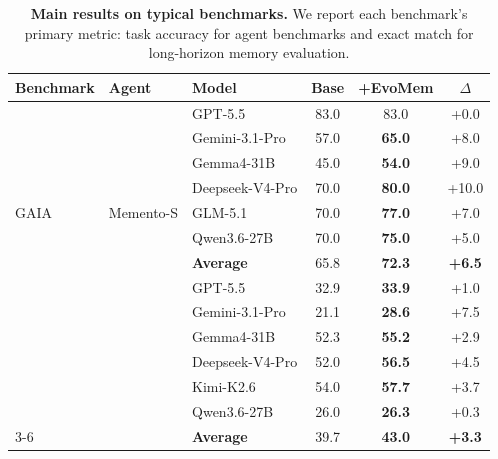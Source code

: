 \documentclass{article}
\begin{document}
\begin{table}[t]
\centering
\setlength{\tabcolsep}{3.5pt}
\renewcommand{\arraystretch}{0.95}
\caption{\small
\textbf{Main results on typical benchmarks.}
We report each benchmark's primary metric: task accuracy for agent benchmarks and exact match for long-horizon memory evaluation.
}
\begin{tabular}{lllccc}
\toprule
\textbf{Benchmark} & \textbf{Agent} & \textbf{Model} & \textbf{Base} & \textbf{+EvoMem} & \textbf{$\Delta$} \\
\midrule

\multirow{9}{*}{GAIA}
& \multirow{9}{*}{Memento-S}
& GPT-5.5 & 83.0 & 83.0 & +0.0 \\
& & Gemini-3.1-Pro & 57.0 & \textbf{65.0} & \textcolor{green!50!black}{+8.0} \\
& & Gemma4-31B & 45.0 & \textbf{54.0} & \textcolor{green!50!black}{+9.0} \\
& & Deepseek-V4-Pro & 70.0 & \textbf{80.0} & \textcolor{green!50!black}{+10.0} \\
& & GLM-5.1 & 70.0 & \textbf{77.0} & \textcolor{green!50!black}{+7.0} \\
& & Qwen3.6-27B & 70.0 & \textbf{75.0} & \textcolor{green!50!black}{+5.0} \\
\cmidrule(l){3-6}
& & \textbf{Average} & 65.8 & \textbf{72.3} & \textcolor{green!50!black}{\textbf{+6.5}} \\
\cmidrule(l){1-6}

\multirow{9}{*}{LoCoMo}
& \multirow{9}{*}{A-Mem}
& GPT-5.5 & 32.9 & \textbf{33.9} & \textcolor{green!50!black}{+1.0} \\
& & Gemini-3.1-Pro & 21.1 & \textbf{28.6} & \textcolor{green!50!black}{+7.5} \\

& & Gemma4-31B & 52.3 & \textbf{55.2} & \textcolor{green!50!black}{+2.9} \\
& & Deepseek-V4-Pro & 52.0 & \textbf{56.5} & \textcolor{green!50!black}{+4.5} \\
& & Kimi-K2.6 & 54.0 & \textbf{57.7} & \textcolor{green!50!black}{+3.7} \\
& & Qwen3.6-27B & 26.0 & \textbf{26.3} & \textcolor{green!50!black}{+0.3} \\
\cmidrule(l){3-6}
& & \textbf{Average} & 39.7 & \textbf{43.0} & \textcolor{green!50!black}{\textbf{+3.3}} \\

\bottomrule
\end{tabular}
\vspace{-3mm}
\label{tab:typical_results}
\end{table}
\end{document}

